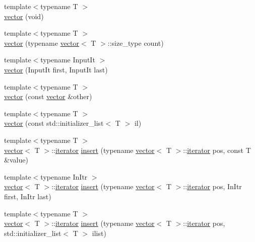 \begin{DoxyCompactItemize}
\item 
{\footnotesize template$<$typename T $>$ }\\\mbox{\hyperlink{classsc_1_1vector_a64ed605fc5b5449da4c90177268ff101}{vector}} (void)
\item 
{\footnotesize template$<$typename T $>$ }\\\mbox{\hyperlink{classsc_1_1vector_a09edcd127164af330873721038aa4ccc}{vector}} (typename \mbox{\hyperlink{classsc_1_1vector}{vector}}$<$ T $>$\+::size\+\_\+type count)
\item 
{\footnotesize template$<$typename Input\+It $>$ }\\\mbox{\hyperlink{classsc_1_1vector_ab58c55200c6a120b9d24793a271512fb}{vector}} (Input\+It first, Input\+It last)
\item 
{\footnotesize template$<$typename T $>$ }\\\mbox{\hyperlink{classsc_1_1vector_a6954f3fbe0bce1016e72da109a33ac27}{vector}} (const \mbox{\hyperlink{classsc_1_1vector}{vector}} \&other)
\item 
{\footnotesize template$<$typename T $>$ }\\\mbox{\hyperlink{classsc_1_1vector_a70d31da6728917d2a55f3c280351703e}{vector}} (const std\+::initializer\+\_\+list$<$ T $>$ il)
\item 
{\footnotesize template$<$typename T $>$ }\\\mbox{\hyperlink{classsc_1_1vector}{vector}}$<$ T $>$\+::\mbox{\hyperlink{classsc_1_1vector_1_1iterator}{iterator}} \mbox{\hyperlink{classsc_1_1vector_a1aaf0a1fcdac2a58a96a2a00105b2e1f}{insert}} (typename \mbox{\hyperlink{classsc_1_1vector}{vector}}$<$ T $>$\+::\mbox{\hyperlink{classsc_1_1vector_1_1iterator}{iterator}} pos, const T \&value)
\item 
{\footnotesize template$<$typename In\+Itr $>$ }\\\mbox{\hyperlink{classsc_1_1vector}{vector}}$<$ T $>$\+::\mbox{\hyperlink{classsc_1_1vector_1_1iterator}{iterator}} \mbox{\hyperlink{classsc_1_1vector_a774a81ea7131584862592c29a8137e28}{insert}} (typename \mbox{\hyperlink{classsc_1_1vector}{vector}}$<$ T $>$\+::\mbox{\hyperlink{classsc_1_1vector_1_1iterator}{iterator}} pos, In\+Itr first, In\+Itr last)
\item 
{\footnotesize template$<$typename T $>$ }\\\mbox{\hyperlink{classsc_1_1vector}{vector}}$<$ T $>$\+::\mbox{\hyperlink{classsc_1_1vector_1_1iterator}{iterator}} \mbox{\hyperlink{classsc_1_1vector_a4e59b7f5bc99a5436397426626719251}{insert}} (typename \mbox{\hyperlink{classsc_1_1vector}{vector}}$<$ T $>$\+::\mbox{\hyperlink{classsc_1_1vector_1_1iterator}{iterator}} pos, std\+::initializer\+\_\+list$<$ T $>$ ilist)
\end{DoxyCompactItemize}
